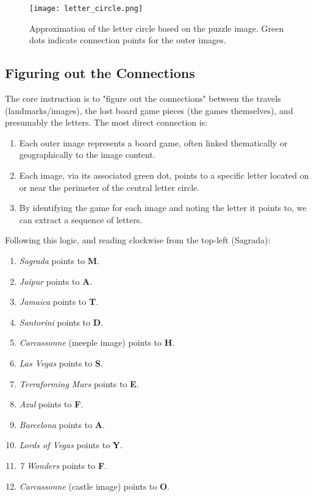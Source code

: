 \documentclass{article}
\begin{document}
\begin{figure}[H]
\centering
\texttt{[image: letter\_circle.png]}
\caption{Approximation of the letter circle based on the puzzle image. Green dots indicate connection points for the outer images.}
\label{fig:letter_circle}
\end{figure}


\subsection{Figuring out the Connections}
The core instruction is to "figure out the connections" between the travels (landmarks/images), the lost board game pieces (the games themselves), and presumably the letters. The most direct connection is:
\begin{enumerate}
    \item Each outer image represents a board game, often linked thematically or geographically to the image content.
    \item Each image, via its associated green dot, points to a specific letter located on or near the perimeter of the central letter circle.
    \item By identifying the game for each image and noting the letter it points to, we can extract a sequence of letters.
\end{enumerate}

Following this logic, and reading clockwise from the top-left (Sagrada):
\begin{enumerate}
    \item \textit{Sagrada} points to \textbf{M}.
    \item \textit{Jaipur} points to \textbf{A}.
    \item \textit{Jamaica} points to \textbf{T}.
    \item \textit{Santorini} points to \textbf{D}.
    \item \textit{Carcassonne} (meeple image) points to \textbf{H}.
    \item \textit{Las Vegas} points to \textbf{S}.
    \item \textit{Terraforming Mars} points to \textbf{E}.
    \item \textit{Azul} points to \textbf{F}.
    \item \textit{Barcelona} points to \textbf{A}.
    \item \textit{Lords of Vegas} points to \textbf{Y}.
    \item \textit{7 Wonders} points to \textbf{F}.
    \item \textit{Carcassonne} (castle image) points to \textbf{O}.
\end{enumerate}
\end{document}
